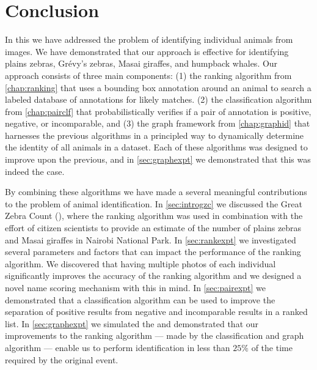 \begin{comment}
    ./texfix.py --fpaths chapter6-conclusion.tex --outline --asmarkdown --numlines=99 -w
\end{comment}

\chapter{Conclusion}\label{chap:conclusion} %

    In this \thesis{} we have addressed the problem of identifying individual animals from images.
    We have demonstrated that our approach is effective for identifying plains zebras, Grévy's zebras, Masai
      giraffes, and humpback whales.
    Our approach consists of three main components:
    (1) the ranking algorithm from \cref{chap:ranking} that uses a bounding box annotation around an animal to
      search a labeled database of annotations for likely matches.
    (2) the classification algorithm from \cref{chap:pairclf} that probabilistically verifies if a pair of
      annotation is positive, negative, or incomparable, and
    (3) the graph framework from \cref{chap:graphid} that harnesses the previous algorithms in a principled way
      to dynamically determine the identity of all animals in a dataset.
    Each of these algorithms was designed to improve upon the previous, and in \cref{sec:graphexpt} we
      demonstrated that this was indeed the case.

    By combining these algorithms we have made a several meaningful contributions to the problem of animal
      identification.
    In \cref{sec:introgzc} we discussed the Great Zebra Count (\GZC{}), where the ranking algorithm was used in
      combination with the effort of citizen scientists to provide an estimate of the number of plains zebras and
      Masai giraffes in Nairobi National Park.
    In \cref{sec:rankexpt} we investigated several parameters and factors that can impact the performance of the
      ranking algorithm.
    We discovered that having multiple photos of each individual significantly improves the accuracy of the
      ranking algorithm and we designed a novel name scoring mechanism with this in mind.
    In \cref{sec:pairexpt} we demonstrated that a classification algorithm can be used to improve the separation
      of positive results from negative and incomparable results in a ranked list.
    In \cref{sec:graphexpt} we simulated the \GZC{} and demonstrated that our improvements to the ranking
      algorithm --- made by the classification and graph algorithm --- enable us to perform identification in less
      than $25\percent$ of the time required by the original event.

